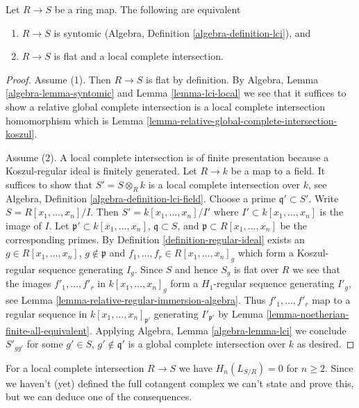\begin{lemma}
\label{lemma-syntomic-lci}
Let $R \to S$ be a ring map. The following are equivalent
\begin{enumerate}
\item $R \to S$ is syntomic
(Algebra, Definition \ref{algebra-definition-lci}), and
\item $R \to S$ is flat and a local complete intersection.
\end{enumerate}
\end{lemma}

\begin{proof}
Assume (1). Then $R \to S$ is flat by definition.
By Algebra, Lemma \ref{algebra-lemma-syntomic} and
Lemma \ref{lemma-lci-local} we see that it suffices to
show a relative global complete intersection is
a local complete intersection homomorphism which is
Lemma \ref{lemma-relative-global-complete-intersection-koszul}.

\medskip\noindent
Assume (2). A local complete intersection is of finite presentation
because a Koszul-regular ideal is finitely generated.
Let $R \to k$ be a map to a field. It suffices to show that
$S' = S \otimes_R k$ is a local complete intersection over $k$, see
Algebra, Definition \ref{algebra-definition-lci-field}.
Choose a prime $\mathfrak q' \subset S'$.
Write $S = R[x_1, \ldots, x_n]/I$.
Then $S' = k[x_1, \ldots, x_n]/I'$ where
$I' \subset k[x_1, \ldots, x_n]$ is the image of $I$.
Let $\mathfrak p' \subset k[x_1, \ldots, x_n]$,
$\mathfrak q \subset S$,
and $\mathfrak p \subset R[x_1, \ldots, x_n]$
be the corresponding primes.
By Definition \ref{definition-regular-ideal}
exists an $g \in R[x_1, \ldots, x_n]$, $g \not \in \mathfrak p$
and $f_1, \ldots, f_r \in R[x_1, \ldots, x_n]_g$ which form
a Koszul-regular sequence generating $I_g$.
Since $S$ and hence $S_g$ is flat over $R$
we see that the images $f'_1, \ldots, f'_r$ in
$k[x_1, \ldots, x_n]_g$ form a $H_1$-regular sequence
generating $I'_g$, see
Lemma \ref{lemma-relative-regular-immersion-algebra}.
Thus $f'_1, \ldots, f'_r$ map to a regular sequence in
$k[x_1, \ldots, x_n]_{\mathfrak p'}$ generating
$I'_{\mathfrak p'}$ by Lemma \ref{lemma-noetherian-finite-all-equivalent}.
Applying Algebra, Lemma \ref{algebra-lemma-lci}
we conclude $S'_{gg'}$ for some $g' \in S$, $g' \not \in \mathfrak q'$
is a global complete intersection over $k$ as desired.
\end{proof}

\noindent
For a local complete intersection $R \to S$ we have $H_n(L_{S/R}) = 0$ for
$n \geq 2$. Since we haven't (yet) defined the full cotangent complex
we can't state and prove this, but we can deduce one of the consequences.

